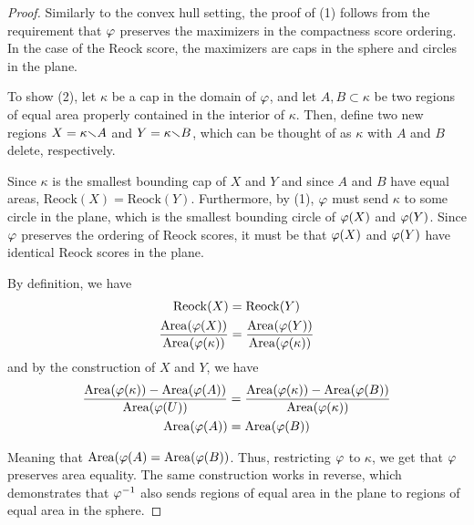 \begin{proof}
  Similarly to the convex hull setting, the proof of (1) follows from the requirement that $\varphi$ preserves the maximizers in the compactness score ordering.  In the case of the Reock score, the maximizers are caps in the sphere and circles in the plane.

  

  To show (2), let $\kappa$ be a cap in the domain of $\varphi$, and let 
  $A,B\subset \kappa$ be two regions of equal area properly contained in the interior of
  $\kappa$. Then, define two new regions $X=\kappa{\smallsetminus} A$ and $Y=\kappa{\smallsetminus} B$, which can be 
  thought of as $\kappa$ with $A$ and $B$ delete, respectively. 
  
  Since $\kappa$ is the smallest bounding cap of $X$ and $Y$ and since $A$ and $B$ have equal areas, $\mathrm{Reock}(X)=\mathrm{Reock}(Y)$.  Furthermore, by (1), $\varphi$ must send $\kappa$ to some circle in the plane, 
  which is the smallest bounding circle of $\varphi(X)$ and $\varphi(Y)$.    
  Since $\varphi$ preserves the ordering of Reock scores, it must be that $\varphi(X)$ and $\varphi(Y)$ have identical Reock 
  scores in the plane.
  
  By definition, we have
  \begin{align*}
  \mathrm{Reock}(X) &= \mathrm{Reock}(Y)\\
  \frac{\mathrm{Area}(\varphi(X))}{\mathrm{Area}(\varphi(\kappa))} &= \frac{\mathrm{Area}(\varphi(Y))}{\mathrm{Area}(\varphi(\kappa))}
  \end{align*}
  and by the construction of $X$ and $Y$, we have 
  \begin{align*}
  \frac{\mathrm{Area}(\varphi(\kappa)) - \mathrm{Area}(\varphi(A))}{\mathrm{Area}(\varphi(U))} &= \frac{\mathrm{Area}(\varphi(\kappa)) - \mathrm{Area}(\varphi(B))}{\mathrm{Area}(\varphi(\kappa))}\\
  \mathrm{Area}(\varphi(A)) &= \mathrm{Area}(\varphi(B))
  \end{align*}
  
  
  
  Meaning that $\mathrm{Area}(\varphi(A) = \mathrm{Area}(\varphi(B))$. 
  Thus, restricting $\varphi$ to $\kappa$, we get that 
  $\varphi$ preserves area equality.
  The same construction works in reverse, which demonstrates that  $\varphi^{-1}$ also sends 
  regions of equal area in the plane to regions of  equal area in the sphere.
  
 \end{proof} 
